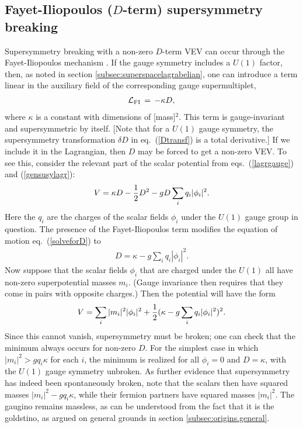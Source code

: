 \documentclass[12pt]{article}
\def\beq{\begin{eqnarray}}
\def\eeq{\end{eqnarray}}
\def\lagr{{\cal L}}
\begin{document}
\subsection{Fayet-Iliopoulos ($D$-term) supersymmetry breaking
\label{subsec:origins.Dterm}}
\setcounter{equation}{0}
\setcounter{footnote}{1}

Supersymmetry breaking with a non-zero $D$-term VEV can occur through the
Fayet-Iliopoulos mechanism \cite{FayetIliopoulos}. If the gauge symmetry
includes a $U(1)$ factor, then, as noted in section \ref{subsec:superspacelagrabelian}, 
one can introduce a term linear in the
auxiliary field of the corresponding gauge supermultiplet,
\beq
\lagr_{\rm FI} \,=\, -\kappa D,
\label{FI}
\eeq
where $\kappa$ is a constant with dimensions of [mass]$^2$. This
term is gauge-invariant and supersymmetric by itself. [Note that for a
$U(1)$ gauge symmetry, the supersymmetry transformation $\delta D$ in
eq.~(\ref{Dtransf}) is a total derivative.] If we include it in the
Lagrangian, then $D$ may be forced to get a non-zero VEV. To see this,
consider the relevant part of the scalar potential from
eqs.~(\ref{lagrgauge}) and (\ref{gensusylagr}):
\beq
V = \kappa D -{1\over 2} D^2 - g D \sum_i q_i |\phi_i|^2 .
\eeq
Here the $q_i$ are the charges of the scalar fields $\phi_i$ under the
$U(1)$ gauge group in question. The presence of the Fayet-Iliopoulos term
modifies the equation of motion eq.~(\ref{solveforD}) to
\beq
D = \kappa - g \sum_i q_i |\phi_i|^2.
\label{booya}
\eeq
Now suppose that the scalar fields $\phi_i$ that are charged under the
$U(1)$ all have non-zero superpotential masses $m_i$. (Gauge invariance
then requires that they come in pairs with opposite charges.) Then the
potential will have the form
\beq
V  = \sum_i |m_i|^2 |\phi_i|^2 +
     {1\over 2} (\kappa -g \sum_i q_i |\phi_i|^2)^2 .
\eeq
Since this cannot vanish, supersymmetry must be broken; one can check that
the minimum always occurs for non-zero $D$. For the simplest case in which
$|m_i|^2 > g q_i \kappa$ for each $i$, the minimum is realized for all
$\phi_i=0$ and $D = \kappa$, with the $U(1)$ gauge symmetry unbroken.  As
further evidence that supersymmetry has indeed been spontaneously broken,
note that the scalars then have squared masses $|m_i|^2 - g q_i \kappa$,
while their fermion partners have squared masses $|m_i|^2$. The gaugino
remains massless, as can be understood from the fact that
it is the goldstino, as argued on general
grounds in section \ref{subsec:origins.general}.
\end{document}
